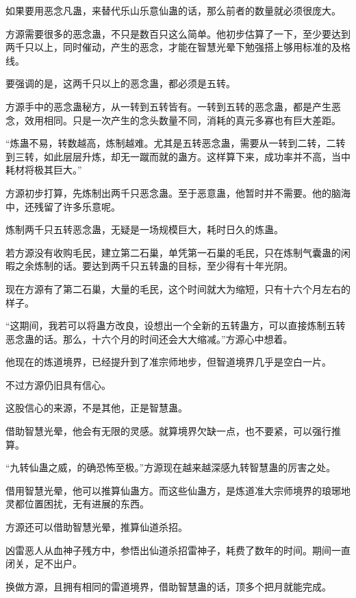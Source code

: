 
\begin{this_body}

如果要用恶念凡蛊，来替代乐山乐意仙蛊的话，那么前者的数量就必须很庞大。

方源需要很多的恶念蛊，不只是数百只这么简单。他初步估算了一下，至少要达到两千只以上，同时催动，产生的恶念，才能在智慧光晕下勉强搭上够用标准的及格线。

要强调的是，这两千只以上的恶念蛊，都必须是五转。

方源手中的恶念蛊秘方，从一转到五转皆有。一转到五转的恶念蛊，都是产生恶念，效用相同。只是一次产生的念头数量不同，消耗的真元多寡也有巨大差距。

“炼蛊不易，转数越高，炼制越难。尤其是五转恶念蛊，需要从一转到二转，二转到三转，如此层层升炼，却无一蹴而就的蛊方。这样算下来，成功率并不高，当中耗材将极其巨大。”

方源初步打算，先炼制出两千只恶念蛊。至于恶意蛊，他暂时并不需要。他的脑海中，还残留了许多乐意呢。

炼制两千只五转恶念蛊，无疑是一场规模巨大，耗时日久的炼蛊。

若方源没有收购毛民，建立第二石巢，单凭第一石巢的毛民，只在炼制气囊蛊的闲暇之余炼制的话。要达到两千只五转蛊的目标，至少得有十年光阴。

现在方源有了第二石巢，大量的毛民，这个时间就大为缩短，只有十六个月左右的样子。

“这期间，我若可以将蛊方改良，设想出一个全新的五转蛊方，可以直接炼制五转恶念蛊的话。那么，十六个月的时间还会大大缩减。”方源心中想着。

他现在的炼道境界，已经提升到了准宗师地步，但智道境界几乎是空白一片。

不过方源仍旧具有信心。

这股信心的来源，不是其他，正是智慧蛊。

借助智慧光晕，他会有无限的灵感。就算境界欠缺一点，也不要紧，可以强行推算。

“九转仙蛊之威，的确恐怖至极。”方源现在越来越深感九转智慧蛊的厉害之处。

借用智慧光晕，他可以推算仙蛊方。而这些仙蛊方，是炼道准大宗师境界的琅琊地灵都位置困扰，无有进展的东西。

方源还可以借助智慧光晕，推算仙道杀招。

凶雷恶人从血神子残方中，参悟出仙道杀招雷神子，耗费了数年的时间。期间一直闭关，足不出户。

换做方源，且拥有相同的雷道境界，借助智慧蛊的话，顶多个把月就能完成。


\end{this_body}
